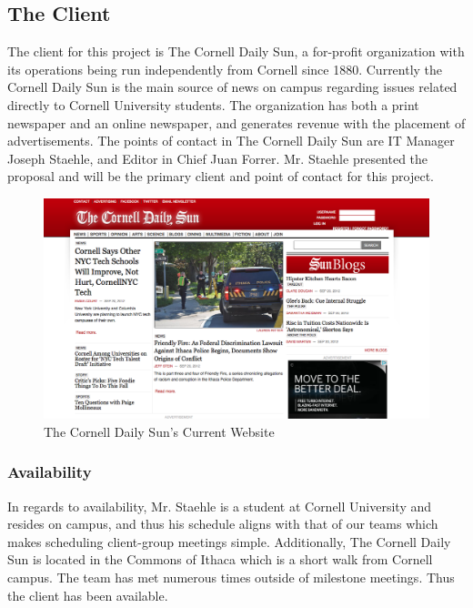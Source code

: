 \documentclass[10pt]{article} %
\begin{document}
\subsection{The Client}

The client for this project is The Cornell Daily Sun, a for-profit organization with its operations being run independently from Cornell since 1880. Currently the Cornell Daily Sun is the main source of news on campus regarding issues related directly to Cornell University students. The organization has both a print newspaper and an online newspaper, and generates revenue with the placement of advertisements. The points of contact in The Cornell Daily Sun are IT Manager Joseph Staehle, and Editor in Chief Juan Forrer.  Mr. Staehle presented the proposal and will be the primary client and point of contact for this project.

\begin{figure}[h]
\begin{center}
\includegraphics[width=\columnwidth]{images/cornell_sun_current}
\end{center}
\caption{The Cornell Daily Sun's Current Website}
\end{figure}

\subsubsection{Availability}

In regards to availability, Mr. Staehle is a student at Cornell University and resides on campus, and thus his schedule aligns with that of our teams which makes scheduling client-group meetings simple. Additionally, The Cornell Daily Sun is located in the Commons of Ithaca which is a short walk from Cornell campus. The team has met numerous times outside of milestone meetings. Thus the client has been available.
\end{document}
